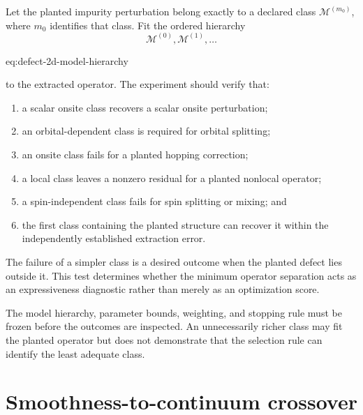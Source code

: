 Let the planted impurity perturbation belong exactly to a declared class
$\mathcal M^{(m_0)}$, where $m_0$ identifies that class. Fit the ordered hierarchy
\begin{equation}
    \mathcal M^{(0)},
    \mathcal M^{(1)},
    \ldots
    \label{eq:defect-2d-model-hierarchy}
\end{equation}
\begin{equationterms}{eq:defect-2d-model-hierarchy}
\end{equationterms}
to the extracted operator. The experiment should verify that:
\begin{enumerate}
    \item a scalar onsite class recovers a scalar onsite perturbation;
    \item an orbital-dependent class is required for orbital splitting;
    \item an onsite class fails for a planted hopping correction;
    \item a local class leaves a nonzero residual for a planted nonlocal
          operator;
    \item a spin-independent class fails for spin splitting or mixing; and
    \item the first class containing the planted structure can recover it
          within the independently established extraction error.
\end{enumerate}
The failure of a simpler class is a desired outcome when the planted defect lies
outside it. This test determines whether the minimum operator separation acts
as an expressiveness diagnostic rather than merely as an optimization score.

The model hierarchy, parameter bounds, weighting, and stopping rule must be
frozen before the outcomes are inspected. An unnecessarily richer class may
fit the planted operator but does not demonstrate that the selection rule can
identify the least adequate class.

\section{Smoothness-to-continuum crossover}

